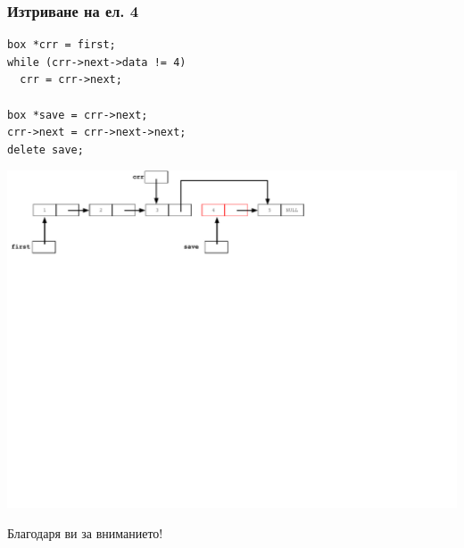 \documentclass{beamer}
\begin{document}
\begin{frame}[fragile]
\frametitle{Изтриване на ел. 4}

\begin{flushleft}
\begin{lstlisting}
box *crr = first;
while (crr->next->data != 4)
  crr = crr->next;

box *save = crr->next;
crr->next = crr->next->next;
delete save;
\end{lstlisting}  
\end{flushleft}


\includegraphics[width=14.0cm]{images/07_ll_remove_skip}

\end{frame}


\begin{frame}
\centerline{Благодаря ви за вниманието!}
\end{frame}
\end{document}
